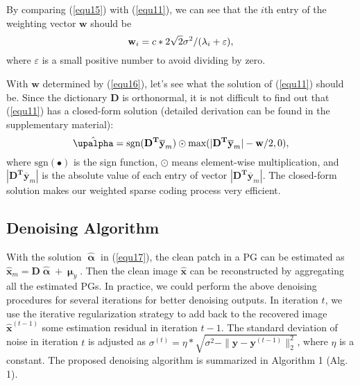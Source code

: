 By comparing (\ref{equ15}) with (\ref{equ11}), we can see that the $i$th entry of the weighting vector $\mathbf{w}$ should be
\begin{equation}\label{equ16}
\setlength{\abovedisplayskip}{3pt}
\setlength{\belowdisplayskip}{3pt}
\mathbf{w}_{i} = c*2\sqrt{2}\sigma^{2}/(\mathbf{\lambda}_{i}+\varepsilon),
\end{equation}
where $\varepsilon$ is a small positive number to avoid dividing by zero.

With $\mathbf{w}$ determined by (\ref{equ16}), let's see what the solution of (\ref{equ11}) should be. Since the dictionary $\mathbf{D}$ is orthonormal, it is not difficult to find out that (\ref{equ11}) has a closed-form solution (detailed derivation can be found in the supplementary material):
\begin{equation}\label{equ17}
\setlength{\abovedisplayskip}{3pt}
\setlength{\belowdisplayskip}{4pt}
\hat{\boldsymbol{\upalpha}}= \text{sgn}(\mathbf{D^{T}\overline{y}}_{m})\odot \text{max}(|\mathbf{D^{T}\overline{y}}_{m}|-\mathbf{w}/2,0),
\end{equation}
where $\text{sgn}(\bullet)$ is the sign function, $\odot$ means element-wise multiplication, and $|\mathbf{D^{T}\overline{y}}_{m}|$ is the absolute value of each entry of vector $|\mathbf{D^{T}\overline{y}}_{m}|$. The closed-form solution makes our weighted sparse coding process very efficient. 
\vspace{-0.05in}
\subsection{Denoising Algorithm}
With the solution $\hat{\boldsymbol{\upalpha}}$ in (\ref{equ17}), the clean patch in a PG can be estimated as $\hat{\mathbf{x}}_{m}=\mathbf{D}\hat{\boldsymbol{\upalpha}}+\boldsymbol{\upmu}_{y}$. Then the clean image $\hat{\mathbf{x}}$ can be reconstructed by aggregating all the estimated PGs. In practice, we could perform the above denoising procedures for several iterations for better denoising outputs. In iteration $t$, we use the iterative regularization strategy \cite{osher2005iterative} to add back to the recovered image $\hat{\mathbf{x}}^{(t-1)}$ some estimation residual in iteration $t-1$. The standard deviation of noise in iteration $t$ is adjusted as $\sigma^{(t)} = \eta*\sqrt{\sigma^{2}-\|\mathbf{y}-\mathbf{y}^{(t-1)}\|_{2}^{2}}$, where $\eta$ is a constant. The proposed denoising algorithm is summarized in Algorithm 1 (Alg. 1).

